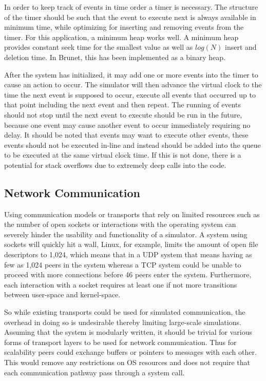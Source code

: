In order to keep track of events in time order a timer is necessary.  The
structure of the timer should be such that the event to execute next is always
available in minimum time, while optimizing for inserting and removing events
from the timer.  For this application, a minimum heap works well.  A minimum
heap provides constant seek time for the smallest value as well as $log(N)$
insert and deletion time.  In Brunet, this has been implemented as a binary
heap.

After the system has initialized, it may add one or more events into the timer
to cause an action to occur.  The simulator will then advance the virtual clock
to the time the next event is supposed to occur, execute all events that
occurred up to that point including the next event and then repeat.  The
running of events should not stop until the next event to execute should be run
in the future, because one event may cause another event to occur immediately
requiring no delay.  It should be noted that events may want to execute other
events, these events should not be executed in-line and instead should be added
into the queue to be executed at the same virtual clock time.  If this is not
done, there is a potential for stack overflows due to extremely deep calls into
the code.

\subsection{Network Communication}
\label{ap2p:nc}

Using communication models or transports that rely on limited resources such as
the number of open sockets or interactions with the operating system can
severely hinder the usability and functionality of a simulator.  A system using
sockets will quickly hit a wall, Linux, for example, limits the amount of open
file descriptors to 1,024, which means that in a UDP system that means having
as few as 1,024 peers in the system whereas a TCP system could be unable to
proceed with more connections before 46 peers enter the system.  Furthermore,
each interaction with a socket requires at least one if not more transitions
between user-space and kernel-space.

So while existing transports could be used for simulated communication, the
overhead in doing so is undesirable thereby limiting large-scale simulations.
Assuming that the system is modularly written, it should be trivial for various
forms of transport layers to be used for network communication.  Thus for
scalability peers could exchange buffers or pointers to messages with each
other.  This would remove any restrictions on OS resources and does not require
that each communication pathway pass through a system call.

